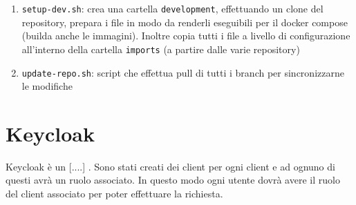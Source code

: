 \documentclass[11pt]{article}
\begin{document}
\begin{enumerate}
    \item \texttt{setup-dev.sh}: crea una cartella \texttt{development}, effettuando un clone del repository, prepara i file in modo da renderli eseguibili per il docker compose (builda anche le immagini). Inoltre copia
        tutti i file a livello di configurazione all'interno della cartella \texttt{imports} (a partire dalle varie repository)
    \item \texttt{update-repo.sh}: script che effettua pull di tutti i branch per sincronizzarne le modifiche
\end{enumerate}


\section{Keycloak}

Keycloak è un [....] . Sono stati creati dei client per ogni client e ad ognuno di questi avrà un ruolo associato.
In questo modo ogni utente dovrà avere il ruolo del client associato per poter effettuare la richiesta.


\pagebreak






\pagebreak
\end{document}
